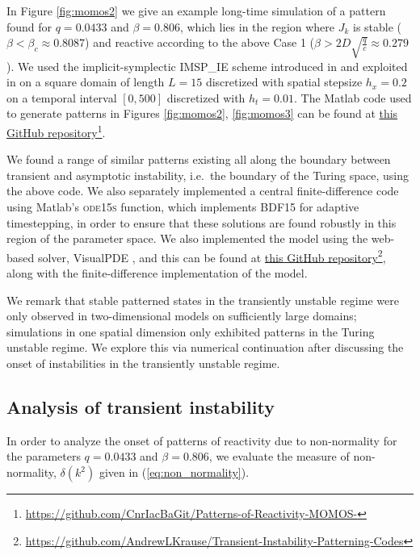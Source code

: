 \documentclass{article}
\newcommand{\jac}{J_{k}}
\begin{document}
In Figure \ref{fig:momos2} {we give an example long-time simulation of a pattern} found for $q=0.0433$ and $\beta=0.806$, which lies in the region where $\jac$ is stable ($\beta < \beta_c \approx 0.8087$) and reactive according to the above Case 1  ($\beta > 2 D \sqrt{\frac{q}{c}} \approx 0.279$).  We used the implicit-symplectic IMSP\_IE scheme introduced in \cite{settanni2016devising, diele2019geometric} and exploited in \cite{noi} on a square domain of length $L=15$ discretized with spatial stepsize $h_x=0.2$ on a temporal interval $[0,500]$ discretized with $h_t=0.01$. 
The Matlab code used to generate patterns in Figures \ref{fig:momos2}, \ref{fig:momos3} can be found at \href{https://github.com/CnrIacBaGit/Patterns-of-Reactivity-MOMOS-}{this GitHub repository}\footnote{\url{https://github.com/CnrIacBaGit/Patterns-of-Reactivity-MOMOS-}}.

{We found a range of similar patterns existing all along the boundary between transient and asymptotic instability, i.e.~the boundary of the Turing space, using the above code. We also separately implemented a central finite-difference code using Matlab's \textsc{ode15s} function, which implements BDF15 for adaptive timestepping, in order to ensure that these solutions are found robustly in this region of the parameter space. We also implemented the model using the web-based solver, VisualPDE \cite{walker2023visualpde}, and this can be found at \href{https://github.com/AndrewLKrause/Transient-Instability-Patterning-Codes}{this GitHub repository}\footnote{\url{https://github.com/AndrewLKrause/Transient-Instability-Patterning-Codes}}, along with the finite-difference implementation of the model.} 





{We remark that stable patterned states in the transiently unstable regime were only observed in two-dimensional models on sufficiently large domains; simulations in one spatial dimension only exhibited patterns in the Turing unstable regime. We explore this via numerical continuation after discussing the onset of instabilities in the transiently unstable regime.}


\subsection{Analysis of transient instability} In order to analyze the onset of patterns of reactivity due to non-normality for the {parameters} $q=0.0433$ and $\beta=0.806$, we evaluate the measure of non-normality, $\delta(k^2)$ given in (\ref{eq:non_normality}).
\end{document}
